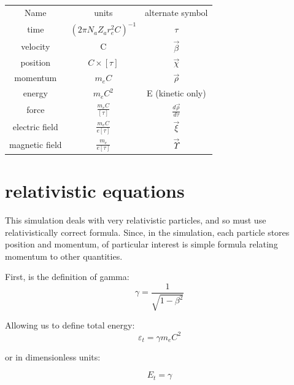\documentclass[]{article}
\begin{document}
\begin{center}
	\begin{tabular}{ c c c }
		Name                 & units                             &   alternate symbol  \\ 
		time                 & $(2\pi N_a Z_a r^2_e C)^{-1}$     & $ \tau$    \\  
		velocity             & C                                 &  $\vec{\beta}$       \\  
		position             & $C\times \left[ \tau \right] $    & $ \vec{\chi} $     \\
		momentum             & $m_e C $                          &  $\vec{\rho} $     \\
		energy               & $m_e C^2 $                        &  E (kinetic only)      \\
		force                & $\frac{m_e C}{ \left[ \tau \right]} $     & $ \frac{d\vec{\rho}}{d\tau}$       \\
		electric field       & $\frac{m_e C}{ e \left[ \tau \right]} $   & $  \vec{\xi}  $   \\
		magnetic field       & $\frac{m_e }{ e \left[ \tau \right]} $    &  $ \vec{\Upsilon} $     \\
	\end{tabular}
\end{center}

\section{relativistic equations}

This simulation deals with very relativistic particles, and so must use relativistically correct formula. Since, in the simulation, each particle stores position and momentum, of particular interest is simple formula relating momentum to other quantities.

First, is the definition of gamma:
\begin{equation}
\gamma = \frac{1}{ \sqrt{1-\beta^2 } }
\end{equation}

Allowing us to define total energy:
\begin{equation}
\varepsilon_t = \gamma m_e C^2
\end{equation}

or in dimensionless units:

\begin{equation}
E_t = \gamma 
\end{equation}
\end{document}
